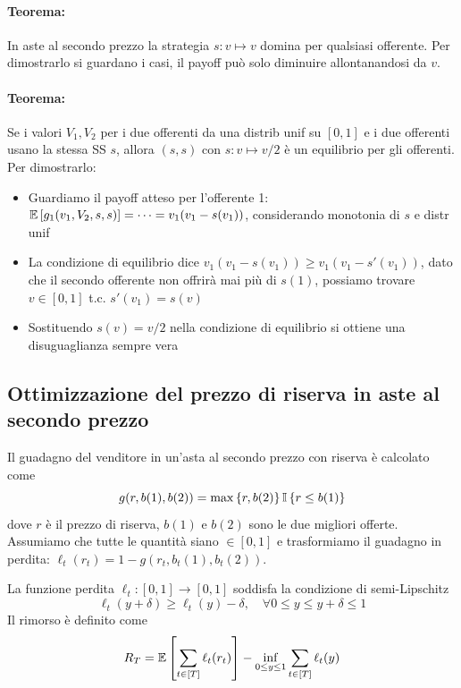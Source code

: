 \paragraph{Teorema:} In aste al secondo prezzo la strategia $s: v \mapsto v$ domina per qualsiasi offerente. Per dimostrarlo si guardano i casi, il payoff può solo diminuire allontanandosi da $v$.

\paragraph{Teorema:} Se i valori $V_1, V_2$ per i due offerenti da una distrib unif su $[0,1]$ e i due offerenti usano la stessa SS $s$, allora $(s,s)$ con $s: v \mapsto v/2$ è un equilibrio per gli offerenti. Per dimostrarlo:
\begin{itemize}
    \item Guardiamo il payoff atteso per l'offerente 1: $\mathbb{E} \left[g_1 (v_1, V_2, s, s)\right] = \dots = v_1 (v_1 - s(v_1))$, considerando monotonia di $s$ e distr unif

    \item La condizione di equilibrio dice $v_1 (v_1 - s(v_1)) \geq v_1 (v_1 - s' (v_1))$, dato che il secondo offerente non offrirà mai più di $s(1)$, possiamo trovare $v \in [0,1]$ t.c. $s'(v_1) = s(v)$

    \item Sostituendo $s(v) = v/2$ nella condizione di equilibrio si ottiene una disuguaglianza sempre vera
\end{itemize}

\subsection{Ottimizzazione del prezzo di riserva in aste al secondo prezzo}

Il guadagno del venditore in un'asta al secondo prezzo con riserva è calcolato come
$$ g (r, b(1), b(2)) = \max \left\{r, b(2)\right\} \mathbb{I} \left\{r \leq b(1) \right\} $$
dove $r$ è il prezzo di riserva, $b(1)$ e $b(2)$ sono le due migliori offerte. Assumiamo che tutte le quantità siano $\in [0,1]$ e trasformiamo il guadagno in perdita: $\ell_t (r_t) = 1 - g(r_t, b_t(1), b_t (2))$.

La funzione perdita $\ell_t: [0,1] \rightarrow [0,1]$ soddisfa la condizione di semi-Lipschitz
\[\ell_t (y + \delta) \geq \ell_t (y)  -\delta, \quad \forall 0 \leq y \leq y + \delta \leq 1 \tag{\dag} \]
Il rimorso è definito come
$$ R_T = \mathbb{E} \left[\sum_{t \in [T]} \ell_t (r_t)\right] - \inf_{0 \leq y \leq 1} \sum_{t \in [T]} \ell_t (y) $$

